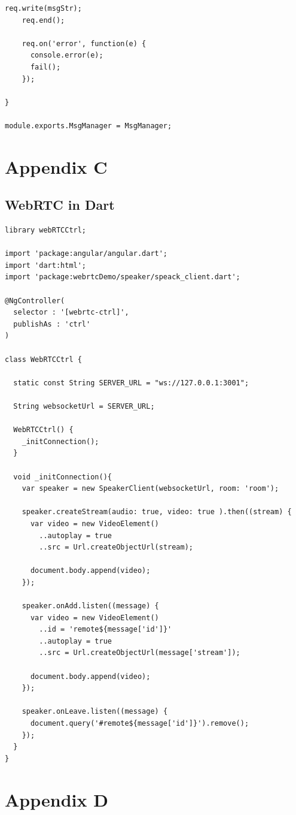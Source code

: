 \begin{appendices}
\begin{lstlisting}[caption={msg.js on Application Server},label={code:msg}]
	req.write(msgStr);
	req.end();

	req.on('error', function(e) {
	  console.error(e);
	  fail();
	});

}

module.exports.MsgManager = MsgManager;
\end{lstlisting}

\chapter{Appendix C}

\section{WebRTC in Dart}
\label{research:dart_webrtcctrl}

\begin{lstlisting}[caption={WebRTCCtrl in Dart application client},label={code:dart_webrtcctrl}]
library webRTCCtrl;

import 'package:angular/angular.dart';
import 'dart:html';
import 'package:webrtcDemo/speaker/speack_client.dart';

@NgController(
  selector : '[webrtc-ctrl]',
  publishAs : 'ctrl'
)

class WebRTCCtrl {

  static const String SERVER_URL = "ws://127.0.0.1:3001";

  String websocketUrl = SERVER_URL;

  WebRTCCtrl() {
    _initConnection();
  }

  void _initConnection(){
    var speaker = new SpeakerClient(websocketUrl, room: 'room');

    speaker.createStream(audio: true, video: true ).then((stream) {
      var video = new VideoElement()
        ..autoplay = true
        ..src = Url.createObjectUrl(stream);

      document.body.append(video);
    });

    speaker.onAdd.listen((message) {
      var video = new VideoElement()
        ..id = 'remote${message['id']}'
        ..autoplay = true
        ..src = Url.createObjectUrl(message['stream']);

      document.body.append(video);
    });

    speaker.onLeave.listen((message) {
      document.query('#remote${message['id']}').remove();
    });
  }
}
\end{lstlisting}

\chapter{Appendix D}


\end{appendices}
